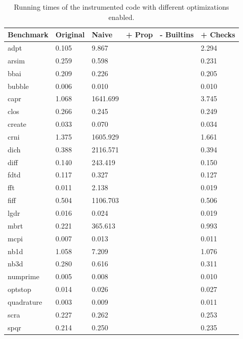 \begin{table}
\begin{tabular}{| l | l | l | l | l | l |}
  \hline
  Benchmark & Original & Naive & + Prop & - Builtins & + Checks \\ \hline
  adpt        & 0.105 & 9.867    & & & 2.294\\ \hline
  arsim       & 0.259 & 0.598    & & & 0.231\\ \hline
  bbai        & 0.209 & 0.226    & & & 0.205\\ \hline
  bubble      & 0.006 & 0.010    & & & 0.010\\ \hline
  capr        & 1.068 & 1641.699 & & & 3.745\\ \hline
  clos        & 0.266 & 0.245    & & & 0.249\\ \hline
  create      & 0.033 & 0.070    & & & 0.034\\ \hline
  crni        & 1.375 & 1605.929 & & & 1.661\\ \hline
  dich        & 0.388 & 2116.571 & & & 0.394\\ \hline
  diff        & 0.140 & 243.419  & & & 0.150\\ \hline
  fdtd        & 0.117 & 0.327    & & & 0.127\\ \hline
  fft         & 0.011 & 2.138    & & & 0.019\\ \hline
  fiff        & 0.504 & 1106.703 & & & 0.506\\ \hline
  lgdr        & 0.016 & 0.024    & & & 0.019\\ \hline
  mbrt        & 0.221 & 365.613  & & & 0.993\\ \hline
  mcpi        & 0.007 & 0.013    & & & 0.011\\ \hline
  nb1d        & 1.058 & 7.209    & & & 1.076\\ \hline
  nb3d        & 0.280 & 0.616    & & & 0.311\\ \hline
  numprime    & 0.005 & 0.008    & & & 0.010\\ \hline
  optstop     & 0.014 & 0.026    & & & 0.027\\ \hline
  quadrature  & 0.003 & 0.009    & & & 0.011\\ \hline
  scra        & 0.227 & 0.262    & & & 0.253\\ \hline
  spqr        & 0.214 & 0.250    & & & 0.235\\ \hline
\end{tabular}
\caption{Running times of the instrumented code with different optimizations
enabled.}
\label{tab:InstrumentationResults}
\end{table}

